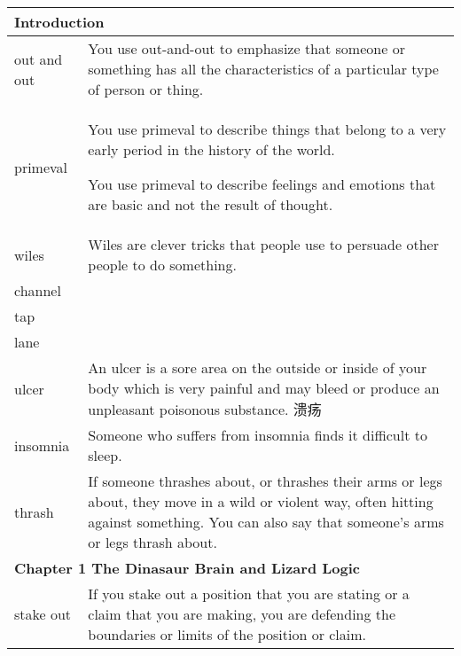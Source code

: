 \documentclass{article}
\begin{document}
\begin{center}
\begin{longtable}{|l|p{9cm}|}

\hline
\multicolumn{2}{|l|}{\textbf{Introduction}}\\

\hline
out and out
&
You use out-and-out to emphasize that someone or something has all the characteristics of a particular type of person or thing.
\\

\hline
primeval
&
You use primeval to describe things that belong to a very early period in the history of the world.
\par
You use primeval to describe feelings and emotions that are basic and not the result of thought.
\\

\hline
wiles
&
Wiles are clever tricks that people use to persuade other people to do something.
\\

\hline
channel

&

\\

\hline
tap
&

\\

\hline
lane
&

\\

\hline
ulcer
&
An ulcer is a sore area on the outside or inside of your body which is very painful and may bleed or produce an unpleasant poisonous substance. 溃疡
\\

\hline
insomnia
&
Someone who suffers from insomnia finds it difficult to sleep.
\\

\hline
thrash
&
If someone thrashes about, or thrashes their arms or legs about, they move in a wild or violent way, often hitting against something. You can also say that someone's arms or legs thrash about.
\\

\hline
\multicolumn{2}{|l|}{\textbf{Chapter 1 The Dinasaur Brain and Lizard Logic}}\\

\hline
stake out
&
If you stake out a position that you are stating or a claim that you are making, you are defending the boundaries or limits of the position or claim.
\\


\end{longtable}
\end{center}
\end{document}

